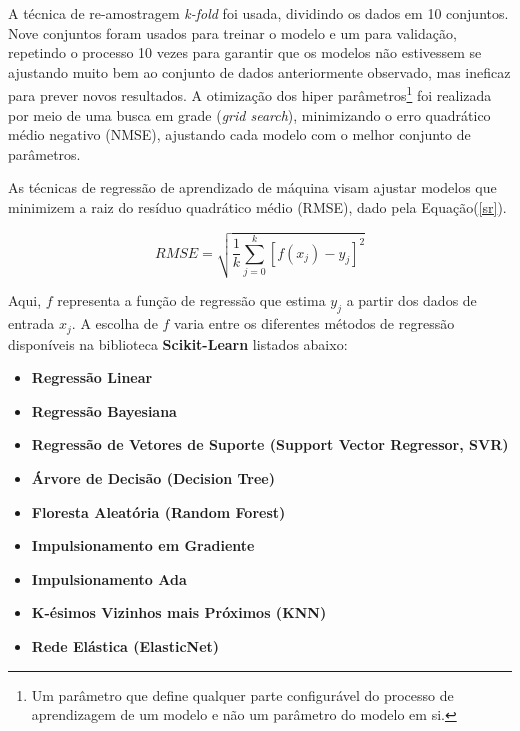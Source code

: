     A técnica de re-amostragem \textit{k-fold} foi usada, dividindo os dados em 10 conjuntos. Nove conjuntos foram usados para treinar o modelo e um para validação, repetindo o processo 10 vezes para garantir que os modelos não estivessem se ajustando muito bem ao conjunto de dados anteriormente observado, mas ineficaz para prever novos resultados. A otimização dos hiper parâmetros\footnote{ Um parâmetro que define qualquer parte configurável do processo de aprendizagem de um modelo e não um parâmetro do modelo em si.} foi realizada por meio de uma busca em grade (\textit{grid search}), minimizando o erro quadrático médio negativo (NMSE), ajustando cada modelo com o melhor conjunto de parâmetros.
    
    As técnicas de regressão de aprendizado de máquina visam ajustar modelos que minimizem a raiz do resíduo quadrático médio (RMSE), dado pela Equação(\ref{sr}).
    
    \begin{equation}
    	\label{sr}
    	RMSE = \sqrt{\frac{1}{k}\sum_{j=0}^{k} [f(x_j) - y_j]^2}
    \end{equation}
    
    Aqui, \( f \) representa a função de regressão que estima \( y_j \) a partir dos dados de entrada \( x_j \). A escolha de \( f \) varia entre os diferentes métodos de regressão disponíveis na biblioteca \textbf{Scikit-Learn} listados abaixo:
    
    \begin{itemize}
    	\item[(i)] \textbf{Regressão Linear}
    	
    	\item[(ii)] \textbf{Regressão Bayesiana}
    	
    	\item[(iii)] \textbf{Regressão de Vetores de Suporte (Support Vector Regressor, SVR)}
    	\item[(iv)] \textbf{Árvore de Decisão (Decision Tree)}
    	
    	\item[(v)] \textbf{Floresta Aleatória (Random Forest)}
    	
    	\item[(vi)] \textbf{Impulsionamento em Gradiente}
    	
    	\item[(vii)] \textbf{Impulsionamento Ada}
    	
    	\item[(viii)] \textbf{K-ésimos Vizinhos mais Próximos (KNN)}
    	
    	\item[(ix)] \textbf{Rede Elástica (ElasticNet)}
    \end{itemize}       
    
